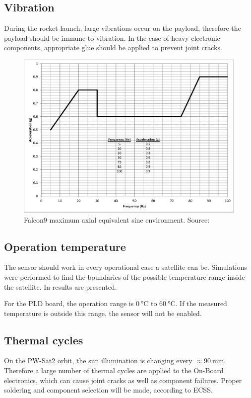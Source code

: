     \subsection{Vibration}
        During the rocket launch, large vibrations occur on the payload, therefore the payload should be immune to vibration. In the case of heavy electronic components, appropriate glue should be applied to prevent joint cracks.
        \begin{figure}[H]
            \centering
            \includegraphics[width=0.5\paperwidth]{img/04/Falcon9_vibration.eps}
            \caption{Falcon9 maximum axial equivalent sine environment. Source: \cite{Falcon9_user_manual}}
            \label{Falcon9_vibration}
        \end{figure}


    \subsection{Operation temperature}
        The sensor should work in every operational case a satellite can be. Simulations were performed to find the boundaries of the  possible temperature range inside the satellite.    In \cite{PWSAT_TCS_CDR} results are presented.

        For the PLD board, the operation range is $\SI{0}{\degreeCelsius}$ to $\SI{60}{\degreeCelsius}$. If the measured temperature is outside this range, the sensor will not be enabled.


    \subsection{Thermal cycles}
        On the PW-Sat2 orbit, the sun illumination is changing every $\approx \SI{90}{\minute}$. Therefore a large number of thermal cycles are applied to the On-Board electronics, which can cause joint cracks as well as component failures. Proper soldering and component selection will be made, according to ECSS.

